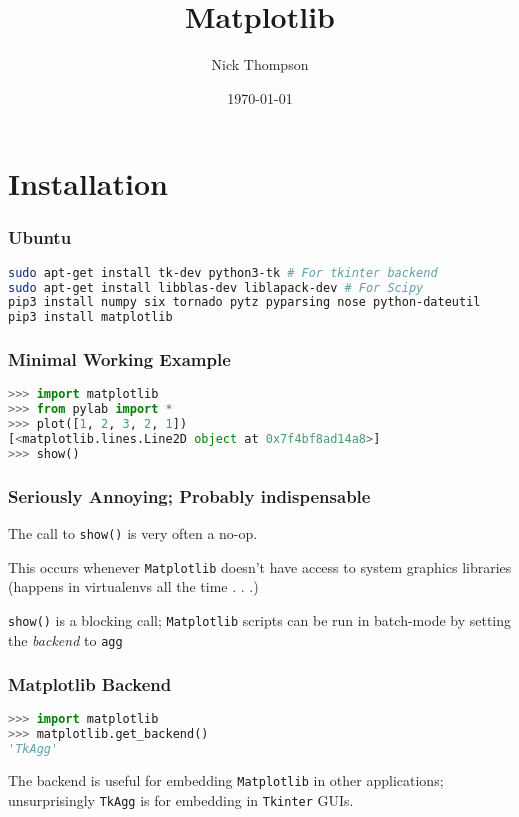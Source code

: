 \documentclass{beamer}
\begin{document}
\title{Matplotlib}
\author{Nick Thompson} 
\date{\today} 

\frame{\titlepage} 



\section{Installation} 

\begin{frame}[fragile]
\frametitle{Ubuntu}

\begin{lstlisting}[language=bash]
sudo apt-get install tk-dev python3-tk # For tkinter backend
sudo apt-get install libblas-dev liblapack-dev # For Scipy
pip3 install numpy six tornado pytz pyparsing nose python-dateutil
pip3 install matplotlib
\end{lstlisting}
\end{frame}

\begin{frame}[fragile]
\frametitle{Minimal Working Example}
\begin{lstlisting}[language=Python]
>>> import matplotlib
>>> from pylab import *
>>> plot([1, 2, 3, 2, 1])
[<matplotlib.lines.Line2D object at 0x7f4bf8ad14a8>]
>>> show()
\end{lstlisting}
\end{frame}

\begin{frame}
\frametitle{Seriously Annoying; Probably indispensable}
The call to \texttt{show()} is very often a no-op.

This occurs whenever \texttt{Matplotlib} doesn't have access to system graphics libraries (happens in virtualenvs all the time . . .)

\texttt{show()} is a blocking call; \texttt{Matplotlib} scripts can be run in batch-mode by setting the \emph{backend} to \texttt{agg}
\end{frame}

\begin{frame}[fragile]
\frametitle{Matplotlib Backend}
\begin{lstlisting}[language=Python]
>>> import matplotlib
>>> matplotlib.get_backend()
'TkAgg'
\end{lstlisting}
The backend is useful for embedding \texttt{Matplotlib} in other applications; unsurprisingly \texttt{TkAgg} is for embedding in \texttt{Tkinter} GUIs.

\end{frame}
\end{document}

